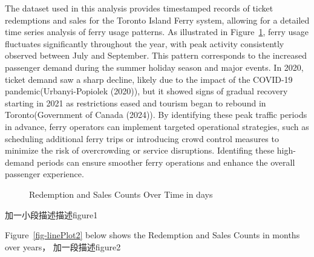 \documentclass[
  letterpaper,
  DIV=11,
  numbers=noendperiod]{scrartcl}
\begin{document}
The dataset used in this analysis provides timestamped records of ticket
redemptions and sales for the Toronto Island Ferry system, allowing for
a detailed time series analysis of ferry usage patterns. As illustrated
in Figure~\ref{fig-linePlot1}, ferry usage fluctuates significantly
throughout the year, with peak activity consistently observed between
July and September. This pattern corresponds to the increased passenger
demand during the summer holiday season and major events. In 2020,
ticket demand saw a sharp decline, likely due to the impact of the
COVID-19 pandemic(Urbanyi-Popiolek (2020)), but it showed signs of
gradual recovery starting in 2021 as restrictions eased and tourism
began to rebound in Toronto(Government of Canada (2024)). By identifying
these peak traffic periods in advance, ferry operators can implement
targeted operational strategies, such as scheduling additional ferry
trips or introducing crowd control measures to minimize the risk of
overcrowding or service disruptions. Identifing these high-demand
periods can ensure smoother ferry operations and enhance the overall
passenger experience.

\begin{figure}


\caption{\label{fig-linePlot1}Redemption and Sales Counts Over Time in
days}

\end{figure}%

加一小段描述描述figure1

Figure~\ref{fig-linePlot2} below shows the Redemption and Sales Counts
in months over years， 加一段描述figure2

\newpage
\end{document}
